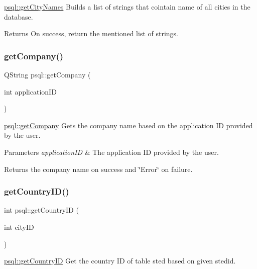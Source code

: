 \mbox{\hyperlink{classpsql_a42ee0cf90055ba6a7a6f564cf04d8bb8}{psql\+::get\+City\+Names}} Builds a list of strings that cointain name of all cities in the database. 

\begin{DoxyReturn}{Returns}
On success, return the mentioned list of strings. 
\end{DoxyReturn}
\mbox{\label{classpsql_a09745cd03f09ffb2dacacaab4281915f}} 
\subsubsection{\texorpdfstring{get\+Company()}{getCompany()}}
{\footnotesize\ttfamily Q\+String psql\+::get\+Company (\begin{DoxyParamCaption}\item[{int}]{application\+ID }\end{DoxyParamCaption})}



\mbox{\hyperlink{classpsql_a09745cd03f09ffb2dacacaab4281915f}{psql\+::get\+Company}} Gets the company name based on the application ID provided by the user. 


\begin{DoxyParams}{Parameters}
{\em application\+ID} & The application ID provided by the user. \\
\hline
\end{DoxyParams}
\begin{DoxyReturn}{Returns}
the company name on success and \char`\"{}\+Error\char`\"{} on failure. 
\end{DoxyReturn}
\mbox{\label{classpsql_a81d02dc0350ba11d90257914078ba432}} 
\subsubsection{\texorpdfstring{get\+Country\+I\+D()}{getCountryID()}}
{\footnotesize\ttfamily int psql\+::get\+Country\+ID (\begin{DoxyParamCaption}\item[{int}]{city\+ID }\end{DoxyParamCaption})}



\mbox{\hyperlink{classpsql_a81d02dc0350ba11d90257914078ba432}{psql\+::get\+Country\+ID}} Get the country ID of table sted based on given stedid. 


